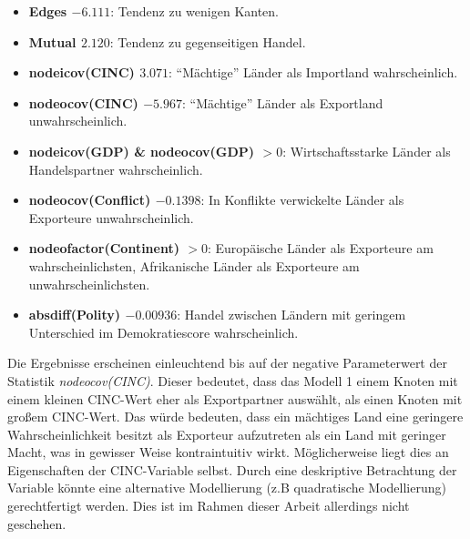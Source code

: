 \documentclass[a4paper,ngerman,oneside,titlepage,bibliography=totoc,11pt]{scrreprt}
\begin{document}
	\begin{itemize}
		\item {\textbf{Edges $-6.111$}: Tendenz zu wenigen Kanten.}
		\item {\textbf{Mutual $2.120$}: Tendenz zu gegenseitigen Handel.}
		\item {\textbf{nodeicov(CINC) $3.071$}: "`Mächtige"' Länder als Importland wahrscheinlich.}
		\item {\textbf{nodeocov(CINC) $-5.967$}: "`Mächtige"' Länder als Exportland unwahrscheinlich.}
		\item {\textbf{nodeicov(GDP) \& nodeocov(GDP) $> 0$}: Wirtschaftsstarke Länder als Handelspartner wahrscheinlich.}
		\item {\textbf{nodeocov(Conflict) $-0.1398$}: In Konflikte verwickelte Länder als Exporteure unwahrscheinlich.}
		\item {\textbf{nodeofactor(Continent) $> 0$}: Europäische Länder als Exporteure am wahrscheinlichsten, Afrikanische Länder als Exporteure am unwahrscheinlichsten.}
		\item {\textbf{absdiff(Polity) $-0.00936$}: Handel zwischen Ländern mit geringem Unterschied im Demokratiescore wahrscheinlich.}
	\end{itemize}

Die Ergebnisse erscheinen einleuchtend bis auf der negative Parameterwert der Statistik \emph{nodeocov(CINC)}. Dieser bedeutet, dass das Modell 1 einem Knoten mit einem kleinen CINC-Wert eher als Exportpartner auswählt, als einen Knoten mit
großem CINC-Wert. Das würde bedeuten, dass ein mächtiges Land eine geringere Wahrscheinlichkeit besitzt als Exporteur aufzutreten als ein Land mit geringer Macht, was in gewisser Weise kontraintuitiv wirkt. Möglicherweise liegt dies an Eigenschaften der CINC-Variable selbst. Durch eine deskriptive Betrachtung der Variable könnte eine alternative Modellierung (z.B quadratische Modellierung) gerechtfertigt werden. Dies ist im Rahmen dieser Arbeit allerdings nicht geschehen.
\end{document}
